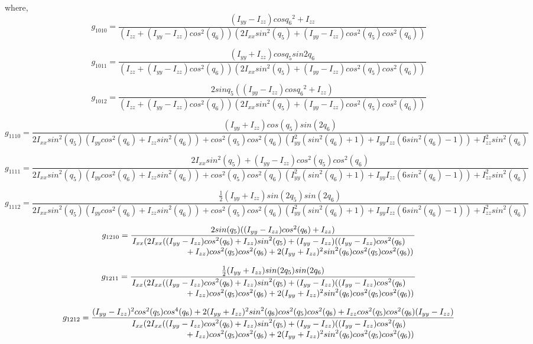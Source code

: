 \documentclass[10pt, letterpaper]{article}
\begin{document}
where,
\[
g_{1010} = \frac{(I_{yy}-I_{zz})cos{q_{6}}^2 + I_{zz}}{(I_{zz} + (I_{yy} - I_{zz}) {cos}^{2}(q_{6})) (2 I_{xx} {sin}^{2}(q_{5}) + (I_{yy} - I_{zz}) {cos}^{2}(q_{5}) {cos}^{2}(q_{6}))}
\]

\[
g_{1011} = \frac{(I_{yy}+I_{zz})cos{q_{5}}sin{2q_{6}}}{(I_{zz} + (I_{yy} - I_{zz}) {cos}^{2}(q_{6})) (2 I_{xx} {sin}^{2}(q_{5}) + (I_{yy} - I_{zz}) {cos}^{2}(q_{5}) {cos}^{2}(q_{6}))}
\]

\[
g_{1012} = \frac{2sin{q_{5}}((I_{yy}-I_{zz})cos{q_{6}}^2 + I_{zz})}{(I_{zz} + (I_{yy} - I_{zz}) {cos}^{2}(q_{6})) (2 I_{xx} {sin}^{2}(q_{5}) + (I_{yy} - I_{zz}) {cos}^{2}(q_{5}) {cos}^{2}(q_{6}))}
\]

\[
g_{1110} = \frac{(I_{yy}+I_{zz})cos(q_{5})sin(2q_{6})}
{2I_{xx}{sin}^2(q_{5})(I_{yy}{cos}^2(q_{6})+I_{zz}{sin}^2(q_{6}))+{cos}^2(q_{5}){cos}^2(q_{6})(I_{yy}^2({sin}^2(q_{6})+1)+I_{yy}I_{zz}(6 {sin}^2(q_{6})-1))+I_{zz}^2{sin}^2(q_{6})}
\]

\[
g_{1111} = \frac{2I_{xx}{sin}^2(q_{5})+(I_{yy}-I_{zz}){cos}^2(q_{5}){cos}^2(q_{6})}
{2I_{xx}{sin}^2(q_{5})(I_{yy}{cos}^2(q_{6})+I_{zz}{sin}^2(q_{6}))+{cos}^2(q_{5}){cos}^2(q_{6})(I_{yy}^2({sin}^2(q_{6})+1)+I_{yy}I_{zz}(6 {sin}^2(q_{6})-1))+I_{zz}^2{sin}^2(q_{6})}
\]

\[
g_{1112} = \frac{\frac{1}{2}(I_{yy}+I_{zz}){sin}(2q_{5}){sin}(2q_{6})}
{2I_{xx}{sin}^2(q_{5})(I_{yy}{cos}^2(q_{6})+I_{zz}{sin}^2(q_{6}))+{cos}^2(q_{5}){cos}^2(q_{6})(I_{yy}^2({sin}^2(q_{6})+1)+I_{yy}I_{zz}(6 {sin}^2(q_{6})-1))+I_{zz}^2{sin}^2(q_{6})}
\]

\[
g_{1210} = \frac{2{sin}(q_{5})((I_{yy}-I_{zz}){cos}^2(q_{6})+I_{zz})}
{\splitfrac{I_{xx}( 2 I_{xx} ((I_{yy}-I_{zz}) {cos}^{2}(q_{6}) + I_{zz}) {sin}^{2}(q_{5}) + 
(I_{yy} - I_{zz}) ((I_{yy}-I_{zz}) {cos}^{2}(q_{6})}
{ + I_{zz}) {cos}^{2}(q_{5}) {cos}^{2}(q_{6}) + 2 (I_{yy} + I_{zz})^{2} {sin}^{2}(q_{6}) {cos}^{2}(q_{5}) {cos}^{2}(q_{6}))}}
\]

\[
g_{1211} = \frac{\frac{1}{2}(I_{yy}+I_{zz}){sin}(2q_{5}){sin}(2q_{6})}
{\splitfrac{I_{xx}( 2 I_{xx} ((I_{yy}-I_{zz}) {cos}^{2}(q_{6}) + I_{zz}) {sin}^{2}(q_{5}) + 
(I_{yy} - I_{zz}) ((I_{yy}-I_{zz}) {cos}^{2}(q_{6})}
{ + I_{zz}) {cos}^{2}(q_{5}) {cos}^{2}(q_{6}) + 2 (I_{yy} + I_{zz})^{2} {sin}^{2}(q_{6}) {cos}^{2}(q_{5}) {cos}^{2}(q_{6}))}}
\]

\[
g_{1212} = \frac{(I_{yy}-I_{zz})^2{cos}^2(q_{5}){cos}^4(q_{6}) + 2(I_{yy}+I_{zz})^2{sin}^2(q_{6}){cos}^2(q_{5}){cos}^2(q_{6})+I_{zz}{cos}^2(q_{5}){cos}^2(q_{6})(I_{yy}-I_{zz})}
{\splitfrac{I_{xx}( 2 I_{xx} ((I_{yy}-I_{zz}) {cos}^{2}(q_{6}) + I_{zz}) {sin}^{2}(q_{5}) + 
(I_{yy} - I_{zz}) ((I_{yy}-I_{zz}) {cos}^{2}(q_{6})}
{ + I_{zz}) {cos}^{2}(q_{5}) {cos}^{2}(q_{6}) + 2 (I_{yy} + I_{zz})^{2} {sin}^{2}(q_{6}) {cos}^{2}(q_{5}) {cos}^{2}(q_{6}))}}
\]
\end{document}
